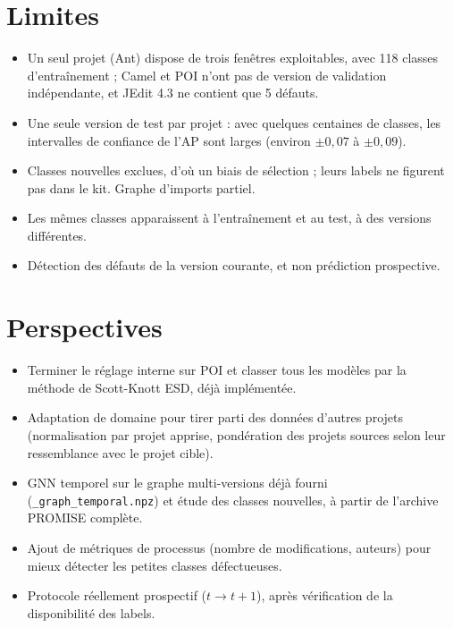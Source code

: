 \documentclass[11pt,a4paper,openany]{report}
\newcommand{\code}[1]{\texttt{\small #1}}
\begin{document}
\section{Limites}
\begin{itemize}
  \item Un seul projet (Ant) dispose de trois fenêtres exploitables, avec 118 classes d'entraînement ; Camel et POI
        n'ont pas de version de validation indépendante, et JEdit 4.3 ne contient que 5 défauts.
  \item Une seule version de test par projet : avec quelques centaines de classes, les intervalles de confiance de
        l'AP sont larges (environ $\pm0{,}07$ à $\pm0{,}09$).
  \item Classes nouvelles exclues, d'où un biais de sélection ; leurs labels ne figurent pas dans le kit. Graphe
        d'imports partiel.
  \item Les mêmes classes apparaissent à l'entraînement et au test, à des versions différentes.
  \item Détection des défauts de la version courante, et non prédiction prospective.
\end{itemize}

\section{Perspectives}
\begin{itemize}
  \item Terminer le réglage interne sur POI et classer tous les modèles par la méthode de Scott-Knott ESD, déjà
        implémentée.
  \item Adaptation de domaine pour tirer parti des données d'autres projets (normalisation par projet apprise,
        pondération des projets sources selon leur ressemblance avec le projet cible).
  \item GNN temporel sur le graphe multi-versions déjà fourni (\code{\_graph\_temporal.npz}) et étude des classes
        nouvelles, à partir de l'archive PROMISE complète.
  \item Ajout de métriques de processus (nombre de modifications, auteurs) pour mieux détecter les petites classes
        défectueuses.
  \item Protocole réellement prospectif ($t\to t+1$), après vérification de la disponibilité des labels.
\end{itemize}
\end{document}
